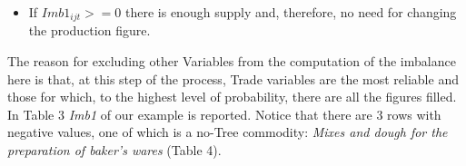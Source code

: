 \documentclass[]{article}
\providecommand{\tightlist}{%
  \setlength{\itemsep}{0pt}\setlength{\parskip}{0pt}}
\begin{document}
\begin{itemize}
\tightlist
\item
  If \(Imb1_{ijt} >= 0\) there is enough supply and, therefore, no need
  for changing the production figure.
\end{itemize}

The reason for excluding other Variables from the computation of the
imbalance here is that, at this step of the process, Trade variables are
the most reliable and those for which, to the highest level of
probability, there are all the figures filled. In Table 3 \emph{Imb1} of
our example is reported. Notice that there are 3 rows with negative
values, one of which is a no-Tree commodity: \emph{Mixes and dough for
the preparation of baker's wares} (Table 4).

\begin{landscape}\begin{table}


\end{table}
\end{landscape}
\end{document}
